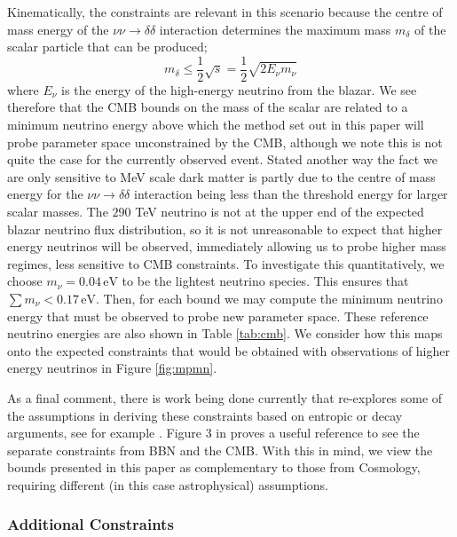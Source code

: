 \documentclass[11pt]{article}
\numberwithin{equation}{section}
\numberwithin{figure}{section}
\numberwithin{table}{section}
\begin{document}
Kinematically, the constraints are relevant in this scenario because the centre of mass energy of the $\nu\nu \rightarrow \delta\delta$ interaction determines the maximum mass $m_\delta$ of the scalar particle that can be produced;
\begin{equation}
    m_\delta \leq \frac{1}{2}\sqrt{s} = \frac{1}{2}\sqrt{2 E_\nu m_\nu}
\end{equation}
where $E_\nu$ is the energy of the high-energy neutrino from the blazar. We see therefore that the CMB bounds on the mass of the scalar are related to a minimum neutrino energy above which the method set out in this paper will probe parameter space unconstrained by the CMB, although we note this is not quite the case for the currently observed event. Stated another way the fact we are only sensitive to MeV scale dark matter is partly due to the centre of mass energy for the $\nu\nu \rightarrow \delta\delta$ interaction being less than the threshold energy for larger scalar masses.  The $290$ TeV neutrino is not at the upper end of the expected blazar neutrino flux distribution, so it is not unreasonable to expect that higher energy neutrinos will be observed, immediately allowing us to probe higher mass regimes, less sensitive to CMB constraints. To investigate this quantitatively, we choose $m_\nu = 0.04\,\mathrm{eV}$ to be the lightest neutrino species. This ensures that $\sum{m_\nu} < 0.17 \, \mathrm{eV}$. Then, for each bound we may compute the minimum neutrino energy that must be observed to probe new parameter space. These reference neutrino energies are also shown in Table \ref{tab:cmb}. We consider how this maps onto the expected constraints that would be obtained with observations of higher energy neutrinos in Figure \ref{fig:mpmn}.

As a final comment, there is work being done currently that re-explores some of the assumptions in deriving these constraints based on entropic or decay arguments, see for example \cite{Kreisch}. Figure 3 in \cite{Wilkinson} proves a useful reference to see the separate constraints from BBN and the CMB. With this in mind, we view the bounds presented in this paper as complementary to those from Cosmology, requiring different (in this case astrophysical) assumptions.

\subsubsection{Additional Constraints}
\end{document}
